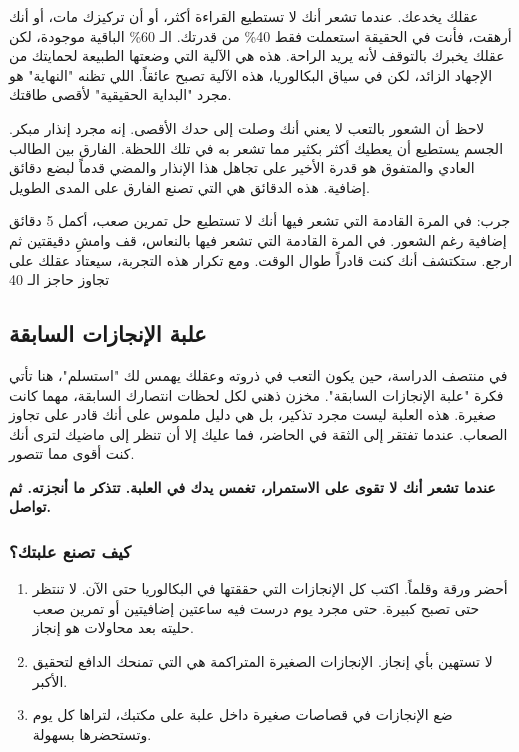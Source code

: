 \documentclass[12pt,a4paper]{book}
\newcommand{\importantAr}[1]{%
	\begin{important}
		\bfseries #1
	\end{important}
}
\begin{document}
	عقلك يخدعك. عندما تشعر أنك لا تستطيع القراءة أكثر، أو أن تركيزك مات، أو أنك أرهقت، فأنت في الحقيقة استعملت فقط 40\% من قدرتك. الـ 60\% الباقية موجودة، لكن عقلك يخبرك بالتوقف لأنه يريد الراحة. هذه هي الآلية التي وضعتها الطبيعة لحمايتك من الإجهاد الزائد، لكن في سياق البكالوريا، هذه الآلية تصبح عائقاً. اللي تظنه "النهاية" هو مجرد "البداية الحقيقية" لأقصى طاقتك.
	
	لاحظ أن الشعور بالتعب لا يعني أنك وصلت إلى حدك الأقصى. إنه مجرد إنذار مبكر. الجسم يستطيع أن يعطيك أكثر بكثير مما تشعر به في تلك اللحظة. الفارق بين الطالب العادي والمتفوق هو قدرة الأخير على تجاهل هذا الإنذار والمضي قدماً لبضع دقائق إضافية. هذه الدقائق هي التي تصنع الفارق على المدى الطويل.
	
	جرب: في المرة القادمة التي تشعر فيها أنك لا تستطيع حل تمرين صعب، أكمل 5 دقائق إضافية رغم الشعور. في المرة القادمة التي تشعر فيها بالنعاس، قف وامشِ دقيقتين ثم ارجع. ستكتشف أنك كنت قادراً طوال الوقت. ومع تكرار هذه التجربة، سيعتاد عقلك على تجاوز حاجز الـ 40%
	
	\subsection{علبة الإنجازات السابقة}
	\label{subsec:cookie-jar}
	
	في منتصف الدراسة، حين يكون التعب في ذروته وعقلك يهمس لك "استسلم"، هنا تأتي فكرة "علبة الإنجازات السابقة". مخزن ذهني لكل لحظات انتصارك السابقة، مهما كانت صغيرة. هذه العلبة ليست مجرد تذكير، بل هي دليل ملموس على أنك قادر على تجاوز الصعاب. عندما تفتقر إلى الثقة في الحاضر، فما عليك إلا أن تنظر إلى ماضيك لترى أنك كنت أقوى مما تتصور.
	
	\importantAr{عندما تشعر أنك لا تقوى على الاستمرار، تغمس يدك في العلبة. تتذكر ما أنجزته. ثم تواصل.}
	
	\subsubsection*{كيف تصنع علبتك؟}
	
	\begin{enumerate}
		\item أحضر ورقة وقلماً. اكتب كل الإنجازات التي حققتها في البكالوريا حتى الآن. لا تنتظر حتى تصبح كبيرة. حتى مجرد يوم درست فيه ساعتين إضافيتين أو تمرين صعب حليته بعد محاولات هو إنجاز.
		\item لا تستهين بأي إنجاز. الإنجازات الصغيرة المتراكمة هي التي تمنحك الدافع لتحقيق الأكبر.
		\item ضع الإنجازات في قصاصات صغيرة داخل علبة على مكتبك، لتراها كل يوم وتستحضرها بسهولة.
	\end{enumerate}
	
\end{document}
